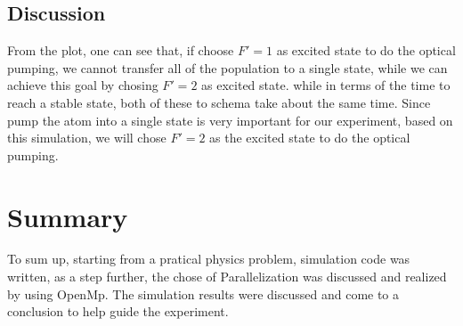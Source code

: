 \documentclass[a4paper, 10pt]{article}
\begin{document}
\subsection{Discussion}
From the plot, one can see that, if choose $F\prime = 1$ as excited state to do the optical pumping, we cannot transfer all of the population to a single state, while we can achieve this goal by chosing $F\prime = 2$ as excited state.  while in terms of the time to reach a stable state, both of these to schema take about the same time. Since pump the atom into a single state is very important for our experiment, based on this simulation, we will chose $F\prime = 2$ as the excited state to do the optical pumping.

\section{Summary}
To sum up, starting from a pratical physics problem, simulation code was written, as a step further, the chose of Parallelization was discussed and realized by using OpenMp. The simulation results were discussed and come to a conclusion to help guide the experiment. 

  
\end{document}
